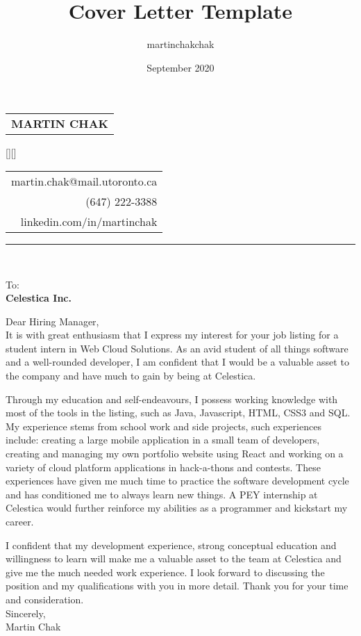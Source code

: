 \documentclass[12pt,letterpaper]{article}
\title{Cover Letter Template}
\author{martinchakchak }
\date{September 2020}
\begin{document}
\noindent
\begin{spacing}{1.125}
    \vfill\noindent
    \begin{tabular}[t]{@{}l} 
      \MakeUppercase{\fontsize{18pt}{5pt}\bf Martin Chak}
    \end{tabular}
    \hfill
    \hspace*{7.5cm}
    \raisebox{0.15cm}[\height][\depth]{
        \begin{tabular}[t]{r}
            martin.chak@mail.utoronto.ca\\
            (647) 222-3388\\
            linkedin.com/in/martinchak
        \end{tabular}
    }
\end{spacing}

\hrule



\noindent\\

\noindent
{\fontsize{10pt}{5pt}To:}\\
{\bf Celestica Inc.}\\

\begin{text}
    Dear Hiring Manager,\\
    
    It is with great enthusiasm that I express my interest for your job listing for a student intern in Web Cloud Solutions. As an avid student of all things software and a well-rounded developer, I am  confident that I would be a valuable asset to the company and have much to gain by being at Celestica.
    
    Through my education and self-endeavours, I possess working knowledge with most of the tools in the listing, such as Java, Javascript, HTML, CSS3 and SQL. My experience stems from school work and side projects, such experiences include: creating a large mobile application in a small team of developers, creating and managing my own portfolio website using React and working on a variety of cloud platform applications in hack-a-thons and contests. These experiences have given me much time to practice the software development cycle and has conditioned me to always learn new things. A PEY internship at Celestica would further reinforce my abilities as a programmer and kickstart my career.
    
    I confident that my development experience, strong conceptual education and willingness to learn will make me a valuable asset to the team at Celestica and give me the much needed work experience. I look forward to discussing the position and my qualifications with you in more detail. Thank you for your time and consideration.\\
    
    Sincerely,\\
    Martin Chak
\end{text}
\end{document}
